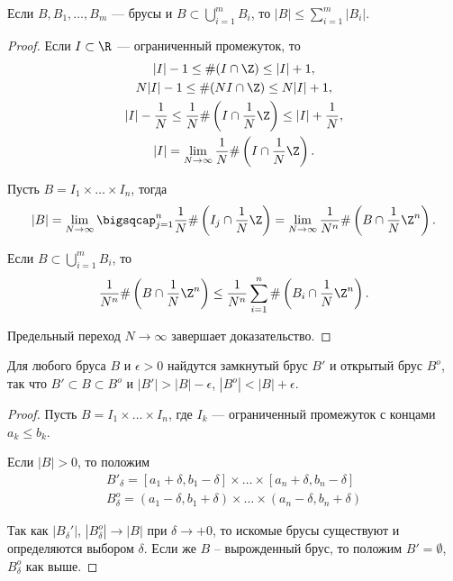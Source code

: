 \begin{property}
    \label{brus-prop1}
    Если $B, B_1, \ldots, B_m$ --- брусы и $B \subset \bigcup_{i = 1}^m B_i$, то $|B| \le \sum_{i = 1}^m |B_i|$.

    \begin{proof}
        Если $I \subset \R$ --- ограниченный промежуток, то
        \begin{gather*}
            |I| - 1 \le \#(I \cap \Z) \le |I| + 1,\\
            N|I| - 1 \le \#(NI \cap \Z) \le N|I| + 1,\\
            |I| - \frac{1}{N} \le \frac{1}{N}\#\left(I \cap \frac{1}{N}\Z\right) \le |I| + \frac{1}{N},\\
            |I| = \lim_{N \rightarrow \infty} \frac{1}{N}\#\left(I \cap \frac{1}{N}\Z\right).
        \end{gather*}

        Пусть $B = I_1 \times \ldots \times I_n$, тогда
        \[
            |B| = \lim_{N \rightarrow \infty} \bigsqcap_{j = 1}^n \frac{1}{N} \#\left(I_j \cap \frac{1}{N}\Z\right) = \lim_{N \rightarrow \infty} \frac{1}{N^n} \#\left(B \cap \frac{1}{N}\Z^n\right).
        \]

        Если $B \subset \bigcup_{i = 1}^m B_i$, то
        \[
            \frac{1}{N^n} \#\left(B \cap \frac{1}{N}\Z^n\right) \le \frac{1}{N^n} \sum_{i = 1}^n \#\left(B_{i} \cap \frac{1}{N}\Z^n\right).
        \]

        Предельный переход $N \rightarrow \infty$ завершает доказательство.
    \end{proof}
\end{property}

\begin{property}
    \label{brus-prop2}
    Для любого бруса $B$ и $\epsilon > 0$ найдутся замкнутый брус $B'$ и открытый брус $B^o$, так что $B' \subset B \subset B^o$ и $|B'| > |B| - \epsilon$, $|B^o| < |B| + \epsilon$.

    \begin{proof}
        Пусть $B = I_1 \times \ldots \times I_n$, где $I_k$ --- ограниченный промежуток с концами $a_k \le b_k$.

        Если $|B| > 0$, то положим
        \begin{gather*}
            B'_\delta = [a_1 + \delta, b_1 - \delta] \times \ldots \times [a_n + \delta, b_n - \delta]\\
            B_\delta^o = (a_1 - \delta, b_1 + \delta) \times \ldots \times (a_n - \delta, b_n + \delta)
        \end{gather*}

        Так как $|B_{\delta}'|$, $|B_{\delta}^{o}| \to |B|$ при $\delta \to +0$, то искомые брусы существуют и определяются выбором $\delta$. Если же $B$ -- вырожденный брус, то положим $B' = \emptyset$, $B_{\delta}^{o}$ как выше.
    \end{proof}
\end{property}